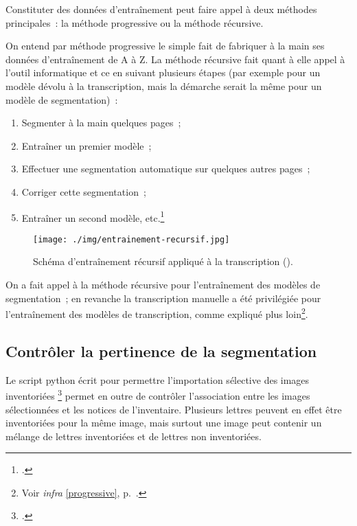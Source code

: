 \documentclass[a4paper,12pt,twoside]{book}
\begin{document}
	    		\label{recursive}
	    		Constituter des données d'entraînement peut faire appel à deux méthodes principales~: la méthode progressive ou la méthode récursive.
	    		
	    		On entend par méthode progressive le simple fait de fabriquer à la main ses données d'entraînement de A à Z. La méthode récursive fait quant à elle appel à l'outil informatique et ce en suivant plusieurs étapes (par exemple pour un modèle dévolu à la transcription, mais la démarche serait la même pour un modèle de segmentation)~:
	    		
	    		\begin{enumerate}
	    			\item Segmenter à la main quelques pages~;
	    			\item Entraîner un premier modèle~;
	    			\item Effectuer une segmentation automatique sur quelques autres pages~;
	    			\item Corriger cette segmentation~;
	    			\item Entraîner un second modèle, etc.\footcite{stokesEScriptoriumVREManuscript2021}
	    		\end{enumerate}
    			
    			\begin{figure}[!h]
    				\centering
    				\texttt{[image: ./img/entrainement-recursif.jpg]}
    				\caption{Schéma d'entraînement récursif appliqué à la transcription (\cite{pincheHTRPresentationProblematiques2021}).}
    				\label{fig}
    			\end{figure}
    			
    			On a fait appel à la méthode récursive pour l'entraînement des modèles de segmentation~; en revanche la transcription manuelle a été privilégiée pour l'entraînement des modèles de transcription, comme expliqué plus loin\footnote{Voir \textit{infra} \ref{progressive}, p.~\pageref{progressive}.}.
	    		
	    	\subsection{Contrôler la pertinence de la segmentation}
		    	\label{controle-segmentation-lettres-inventoriees}
	    		Le script python écrit pour permettre l'importation sélective des images inventoriées \footcite{biayDonneesImagesPy2022} permet en outre de contrôler l'association entre les images sélectionnées et les notices de l'inventaire. Plusieurs lettres peuvent en effet être inventoriées pour la même image, mais surtout une image peut contenir un mélange de lettres inventoriées et de lettres non inventoriées.
	    		
\end{document}
